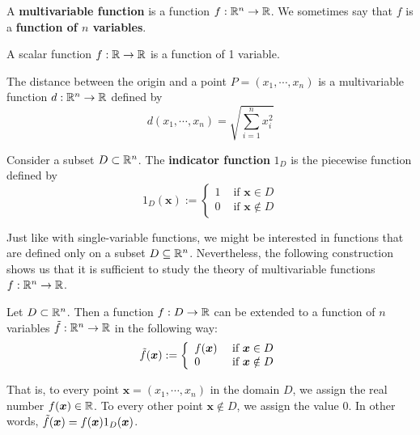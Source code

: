 \begin{definition}
A \textbf{multivariable function} is a function $f : \mathbb{R}^n \to \mathbb{R}$.  We sometimes say that $f$ is a \textbf{function of $n$ variables}.
\end{definition}

\begin{example}
A scalar function $f : \mathbb{R} \to \mathbb{R}$ is a function of 1 variable.
\end{example}

\begin{example}
    The distance between the origin and a point $P = (x_1, \cdots, x_n)$  is a multivariable function $d : \mathbb{R}^n \to \mathbb{R}$ defined by 
    $$d(x_1, \cdots, x_n) = \sqrt{\sum_{i=1}^n x_i^2}$$
\end{example}

\begin{definition}
    Consider a subset $D \subset \mathbb{R}^n$.  The \textbf{indicator function} $1_D$ is the piecewise function defined by
    $$1_D(\bm{x}) := \left\{
		\begin{array}{ll}
			1 & \text{ if } \bm{x} \in D \\
			0 & \text{ if } \bm{x} \notin D
		\end{array}
		\right.$$
    
    \end{definition}



Just like with single-variable functions, we might be interested in functions that are defined only on a subset $D \subseteq \mathbb{R}^n$.  Nevertheless, the following construction shows us that it is sufficient to study the theory of multivariable functions $f : \mathbb{R}^n \to \mathbb{R}$.

\begin{example}
Let $D \subset \mathbb{R}^n$.  Then a function $f : D \to \mathbb{R}$ can be extended to a function of $n$ variables $\Tilde{f} : \mathbb{R}^n \to \mathbb{R}$ in the following way:
$$\Tilde{f}(\bm{x}) := \left\{
		\begin{array}{ll}
			f(\bm{x}) & \text{ if } \bm{x} \in D \\
			0 & \text{ if } \bm{x} \notin D
		\end{array}
		\right.$$

That is, to every point $\bm{x}=(x_1,\cdots,x_n)$ in the domain $D$, we assign the real number $f(\bm{x}) \in \mathbb{R}$.  To every other point $\bm{x} \notin D$, we assign the value $0$.  In other words,  $\Tilde{f}(\bm{x}) = f(\bm{x})1_D(\bm{x})$.  

\end{example}

